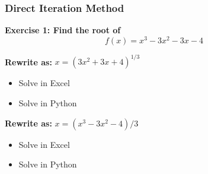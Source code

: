   
  \begin{frame}[fragile]
    \frametitle{Direct Iteration Method}
    
    \textbf{Exercise 1: Find the root of}
    \[
    f(x) = x^3 -3x^2 - 3x - 4
    \]
    
    \textbf{Rewrite as:}
    \(
    x = (3x^2 + 3x + 4)^{1/3}
    \)
    \begin{itemize}
      \item Solve in Excel
      \item Solve in Python
    \end{itemize}
  
    \textbf{Rewrite as:}
    \(
    x = (x^3 - 3x^2 - 4)/3
    \)
    \begin{itemize}
      \item Solve in Excel
      \item Solve in Python
    \end{itemize}
  \end{frame}

